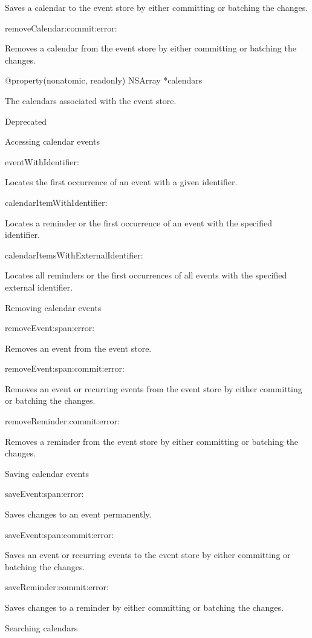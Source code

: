 \documentclass{article}
\begin{document}
Saves a calendar to the event store by either committing or batching the changes.

\textminus removeCalendar:commit:error:

Removes a calendar from the event store by either committing or batching the changes.

@property(nonatomic, readonly) NSArray *calendars

The calendars associated with the event store.

Deprecated

Accessing calendar events

\textminus eventWithIdentifier:

Locates the first occurrence of an event with a given identifier.

\textminus calendarItemWithIdentifier:

Locates a reminder or the first occurrence of an event with the specified identifier.

\textminus calendarItemsWithExternalIdentifier:

Locates all reminders or the first occurrences of all events with the specified external identifier.

Removing calendar events

\textminus removeEvent:span:error:

Removes an event from the event store.

\textminus removeEvent:span:commit:error:

Removes an event or recurring events from the event store by either committing or batching the changes.

\textminus removeReminder:commit:error:

Removes a reminder from the event store by either committing or batching the changes.

Saving calendar events

\textminus saveEvent:span:error:

Saves changes to an event permanently.

\textminus saveEvent:span:commit:error:

Saves an event or recurring events to the event store by either committing or batching the changes.

\textminus saveReminder:commit:error:

Saves changes to a reminder by either committing or batching the changes.

Searching calendars
\end{document}
